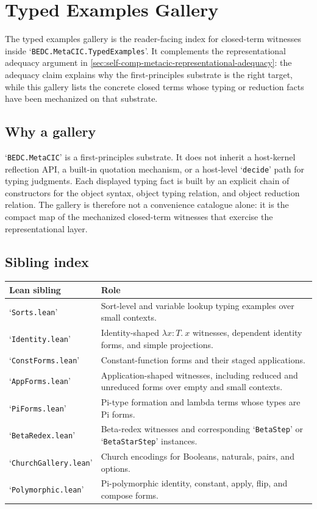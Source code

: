 \section{Typed Examples Gallery}\label{sec:typed-examples-gallery}

The typed examples gallery is the reader-facing index for closed-term witnesses
inside `\verb|BEDC.MetaCIC.TypedExamples|'.  It complements the representational
adequacy argument in \autoref{sec:self-comp-metacic-representational-adequacy}: the
adequacy claim explains why the first-principles substrate is the right target,
while this gallery lists the concrete closed terms whose typing or reduction
facts have been mechanized on that substrate.

\subsection{Why a gallery}\label{subsec:typed-examples-gallery-why}

`\verb|BEDC.MetaCIC|' is a first-principles substrate.  It does not inherit a
host-kernel reflection API, a built-in quotation mechanism, or a host-level
`\verb|decide|' path for typing judgments.  Each displayed typing fact is built
by an explicit chain of constructors for the object syntax, object typing
relation, and object reduction relation.  The gallery is therefore not a
convenience catalogue alone: it is the compact map of the mechanized closed-term
witnesses that exercise the representational layer.

\subsection{Sibling index}\label{subsec:typed-examples-gallery-siblings}

\begin{longtable}{p{}p{}}
\textbf{Lean sibling} & \textbf{Role} \\
\hline
`\verb|Sorts.lean|' & Sort-level and variable lookup typing examples over
small contexts. \\
`\verb|Identity.lean|' & Identity-shaped $\lambda x:T.\ x$ witnesses, dependent
identity forms, and simple projections. \\
`\verb|ConstForms.lean|' & Constant-function forms and their staged
applications. \\
`\verb|AppForms.lean|' & Application-shaped witnesses, including reduced and
unreduced forms over empty and small contexts. \\
`\verb|PiForms.lean|' & Pi-type formation and lambda terms whose types are Pi
forms. \\
`\verb|BetaRedex.lean|' & Beta-redex witnesses and corresponding `\verb|BetaStep|'
or `\verb|BetaStarStep|' instances. \\
`\verb|ChurchGallery.lean|' & Church encodings for Booleans, naturals, pairs,
and options. \\
`\verb|Polymorphic.lean|' & Pi-polymorphic identity, constant, apply, flip, and
compose forms. \\
\end{longtable}

